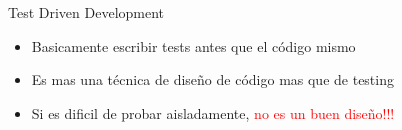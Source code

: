 
\begin{frame}{Test Driven Development} 
    \begin{itemize}
        \item Basicamente escribir tests antes que el código mismo
    \end{itemize}

    \begin{itemize}
        \item Es mas una técnica de diseño de código mas que de testing
        \item Si es dificil de probar aisladamente, \textcolor{red}{no es un buen diseño!!!}
    \end{itemize}
\end{frame}





